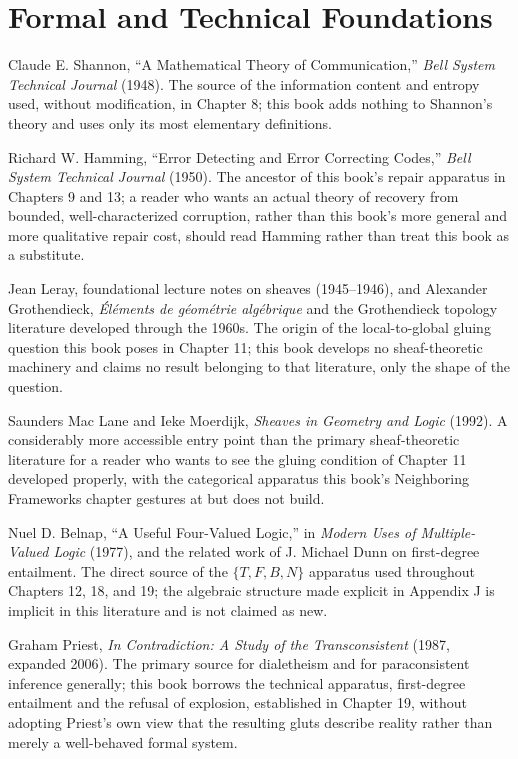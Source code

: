 \documentclass[11pt]{book}
\begin{document}
\section*{Formal and Technical Foundations}

Claude E. Shannon, ``A Mathematical Theory of Communication,'' \emph{Bell System Technical Journal} (1948). The source of the information content and entropy used, without modification, in Chapter 8; this book adds nothing to Shannon's theory and uses only its most elementary definitions.

Richard W. Hamming, ``Error Detecting and Error Correcting Codes,'' \emph{Bell System Technical Journal} (1950). The ancestor of this book's repair apparatus in Chapters 9 and 13; a reader who wants an actual theory of recovery from bounded, well-characterized corruption, rather than this book's more general and more qualitative repair cost, should read Hamming rather than treat this book as a substitute.

Jean Leray, foundational lecture notes on sheaves (1945--1946), and Alexander Grothendieck, \emph{Éléments de géométrie algébrique} and the Grothendieck topology literature developed through the 1960s. The origin of the local-to-global gluing question this book poses in Chapter 11; this book develops no sheaf-theoretic machinery and claims no result belonging to that literature, only the shape of the question.

Saunders Mac Lane and Ieke Moerdijk, \emph{Sheaves in Geometry and Logic} (1992). A considerably more accessible entry point than the primary sheaf-theoretic literature for a reader who wants to see the gluing condition of Chapter 11 developed properly, with the categorical apparatus this book's Neighboring Frameworks chapter gestures at but does not build.

Nuel D. Belnap, ``A Useful Four-Valued Logic,'' in \emph{Modern Uses of Multiple-Valued Logic} (1977), and the related work of J. Michael Dunn on first-degree entailment. The direct source of the $\{T,F,B,N\}$ apparatus used throughout Chapters 12, 18, and 19; the algebraic structure made explicit in Appendix J is implicit in this literature and is not claimed as new.

Graham Priest, \emph{In Contradiction: A Study of the Transconsistent} (1987, expanded 2006). The primary source for dialetheism and for paraconsistent inference generally; this book borrows the technical apparatus, first-degree entailment and the refusal of explosion, established in Chapter 19, without adopting Priest's own view that the resulting gluts describe reality rather than merely a well-behaved formal system.
\end{document}
